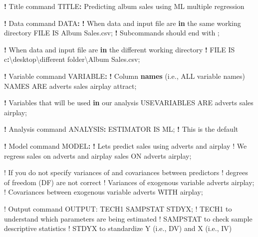 \documentclass[
]{book}
\newenvironment{Shaded}{\begin{snugshade}}{\end{snugshade}}
\newcommand{\ControlFlowTok}[1]{\textcolor[rgb]{0.13,0.29,0.53}{\textbf{#1}}}
\newcommand{\FunctionTok}[1]{\textcolor[rgb]{0.13,0.29,0.53}{\textbf{#1}}}
\newcommand{\NormalTok}[1]{#1}
\newcommand{\SpecialCharTok}[1]{\textcolor[rgb]{0.81,0.36,0.00}{\textbf{#1}}}
\newcommand{\StringTok}[1]{\textcolor[rgb]{0.31,0.60,0.02}{#1}}
\begin{document}
\begin{Shaded}
\begin{Highlighting}[]
\SpecialCharTok{!}\NormalTok{ Title command}
\NormalTok{TITLE}\SpecialCharTok{:}\NormalTok{ Predicting album sales using ML multiple regression}

\SpecialCharTok{!}\NormalTok{ Data command}
\NormalTok{DATA}\SpecialCharTok{:}
    \SpecialCharTok{!}\NormalTok{ When data and input file are }\ControlFlowTok{in}\NormalTok{ the same working directory}
\NormalTok{    FILE IS Album Sales.csv; }\SpecialCharTok{!}\NormalTok{ Subcommands should end with ;}

    \SpecialCharTok{!}\NormalTok{ When data and input file are }\ControlFlowTok{in}\NormalTok{ the different working directory}
    \SpecialCharTok{!}\NormalTok{ FILE IS c}\SpecialCharTok{:}\NormalTok{\textbackslash{}desktop\textbackslash{}different folder\textbackslash{}Album Sales.csv;}

\SpecialCharTok{!}\NormalTok{ Variable command}
\NormalTok{VARIABLE}\SpecialCharTok{:}
    \SpecialCharTok{!}\NormalTok{ Column }\FunctionTok{names}\NormalTok{ (i.e., ALL variable names)}
\NormalTok{    NAMES ARE adverts sales airplay attract;}
    
    \SpecialCharTok{!}\NormalTok{ Variables that will be used }\ControlFlowTok{in}\NormalTok{ our analysis}
\NormalTok{    USEVARIABLES ARE adverts sales airplay;}
    
\SpecialCharTok{!}\NormalTok{ Analysis command}
\NormalTok{ANALYSIS}\SpecialCharTok{:}
\NormalTok{    ESTIMATOR IS ML; }\SpecialCharTok{!}\NormalTok{ This is the default}

\SpecialCharTok{!}\NormalTok{ Model command}
\NormalTok{MODEL}\SpecialCharTok{:}
    \SpecialCharTok{!}\NormalTok{ Let}\StringTok{\textquotesingle{}s predict sales using adverts and airplay}
\StringTok{    ! We regress sales on adverts and airplay}
\StringTok{    sales ON adverts airplay;}

\StringTok{    ! If you do not specify variances of and covariances between predictors}
\StringTok{    ! degrees of freedom (DF) are not correct}
\StringTok{    ! Variances of exogenous variable}
\StringTok{    adverts airplay;}
\StringTok{    ! Covariances between exogenous variable}
\StringTok{    adverts WITH airplay;}

\StringTok{! Output command}
\StringTok{OUTPUT:}
\StringTok{    TECH1 SAMPSTAT STDYX;}
\StringTok{    ! TECH1 to understand which parameters are being estimated}
\StringTok{    ! SAMPSTAT to check sample descriptive statistics}
\StringTok{    ! STDYX to standardize Y (i.e., DV) and X (i.e., IV)}
\end{Highlighting}
\end{Shaded}
\end{document}
